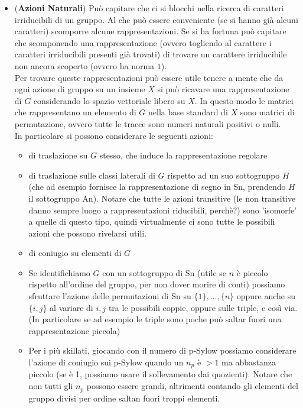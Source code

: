 \documentclass[a4paper,NoNotes,GeneralMath]{stdmdoc}
\begin{document}
\begin{itemize}
		\item ({\bf Azioni Naturali}) Può capitare che ci si blocchi nella ricerca di caratteri irriducibili di un gruppo. Al che può essere conveniente (se si hanno già alcuni caratteri) scomporre alcune rappresentazioni. Se si ha fortuna può capitare che scomponendo una rappresentazione (ovvero togliendo al carattere i caratteri irriducibili presenti già trovati) di trovare un carattere irriducibile non ancora scoperto (ovvero ha norma $1$). \\
		Per trovare queste rappresentazioni può essere utile tenere a mente che da ogni azione di gruppo su un insieme $X$ si può ricavare una rappresentazione di $G$ considerando lo spazio vettoriale libero su $X$. In questo modo le matrici che rappresentano un elemento di $G$ nella base standard di $X$ sono matrici di permutazione, ovvero tutte le tracce sono numeri naturali positivi o nulli. \\
		In particolare si possono considerare le seguenti azioni:
		\begin{itemize}
			\item di traslazione su $G$ stesso, che induce la rappresentazione regolare
			\item di traslazione sulle classi laterali di $G$ rispetto ad un suo sottogruppo $H$ (che ad esempio fornisce la rappresentazione di segno in Sn, prendendo $H$ il sottogruppo An). Notare che tutte le azioni transitive (le non transitive danno sempre luogo a rappresentazioni riducibili, perchè?) sono 'isomorfe' a quelle di questo tipo, quindi virtualmente ci sono tutte le possibili azioni che possono rivelarsi utili.
			\item di coniugio su elementi di $G$
			\item Se identifichiamo $G$ con un sottogruppo di Sn (utile se $n$ è piccolo rispetto all'ordine del gruppo, per non dover morire di conti) possiamo sfruttare l'azione delle permutazioni di Sn su $\{1\}, \ldots, \{n\}$ oppure anche su $\{i, j \}$ al variare di $i, j$ tra le possibili coppie, oppure sulle triple, e così via. (In particolare se ad esempio le triple sono poche può saltar fuori una rappresentazione piccola)
			\item Per i più skillati, giocando con il numero di p-Sylow possiamo considerare l'azione di coniugio sui p-Sylow quando un $n_p$ è $>1$ ma abbastanza piccolo (se è 1, possiamo usare il sollevamento dai quozienti). Notare che non tutti gli $n_p$ possono essere grandi, altrimenti contando gli elementi del gruppo divisi per ordine saltan fuori troppi elementi.
		\end{itemize}


\end{itemize}
\end{document}
